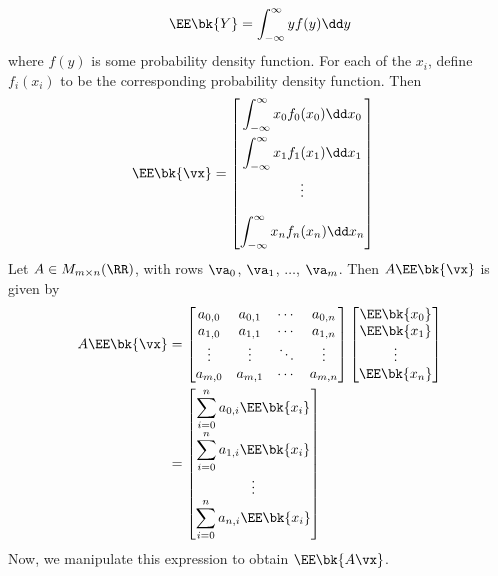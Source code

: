 \documentclass[189]{pset}
\begin{document}
\begin{enumerate}
        \[
          \EE\bk{Y} = \int_{-\infty}^\infty y f(y) \dd y
        \]
        where $f(y)$ is some probability density function. For each of
        the $x_i$, define $f_i(x_i)$ to be the corresponding
        probability density function. Then
        \begin{align*}
          \EE\bk{\vx}
          &=
            \begin{bmatrix}
              \displaystyle\int_{-\infty}^\infty x_0 f_0(x_0) \dd x_0
              \\[1em]
              \displaystyle\int_{-\infty}^\infty x_1 f_1(x_1) \dd x_1
              \\[1em]
              \vdots \\[1em]
              \displaystyle\int_{-\infty}^\infty x_n f_n(x_n) \dd x_n
            \end{bmatrix}
        \end{align*}
        Let $A \in M_{m\times n}(\RR)$, with rows $\va_0$, $\va_1$,
        $\ldots$, $\va_m$. Then $A\EE\bk{\vx}$ is given by
        \begin{align*}
          A\EE\bk{\vx}
          &=
            \begin{bmatrix}
              a_{0,0} & a_{0,1} & \cdots & a_{0,n} \\
              a_{1,0} & a_{1,1} & \cdots & a_{1,n} \\
              \vdots & \vdots & \ddots & \vdots \\
              a_{m,0} & a_{m,1} & \cdots & a_{m,n}
            \end{bmatrix}
            \begin{bmatrix}
              \EE\bk{x_0} \\
              \EE\bk{x_1} \\
              \vdots \\
              \EE\bk{x_n}
            \end{bmatrix} \\
          &=
            \begin{bmatrix}
              \displaystyle\sum_{i=0}^n a_{0,i}\EE\bk{x_i} \\[1em]
              \displaystyle\sum_{i=0}^n a_{1,i}\EE\bk{x_i} \\[1em]
              \vdots\\
              \displaystyle\sum_{i=0}^n a_{n,i}\EE\bk{x_i}
            \end{bmatrix}
        \end{align*}
        Now, we manipulate this expression to obtain $\EE\bk{A\vx}$.

\end{enumerate}
\end{document}
